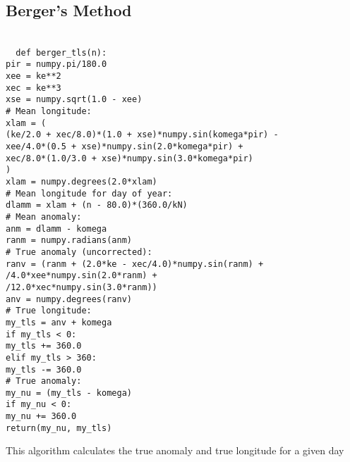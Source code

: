 \subsection{Berger's Method}
\label{app:berger}
\texttt{ \\
~~def berger\_tls(n):\\
 \indent pir = numpy.pi/180.0 \\
 \indent xee = ke**2 \\
 \indent xec = ke**3 \\
 \indent xse = numpy.sqrt(1.0 - xee) \\
 \indent \# Mean longitude: \\
 \indent xlam = ( \\
 \indent \indent (ke/2.0 + xec/8.0)*(1.0 + xse)*numpy.sin(komega*pir) -  \\
 \indent \indent xee/4.0*(0.5 + xse)*numpy.sin(2.0*komega*pir) +  \\
 \indent \indent xec/8.0*(1.0/3.0 + xse)*numpy.sin(3.0*komega*pir) \\
 \indent \indent ) \\
 \indent xlam = numpy.degrees(2.0*xlam) \\
 \indent \# Mean longitude for day of year: \\
 \indent dlamm = xlam + (n - 80.0)*(360.0/kN) \\
 \indent \# Mean anomaly: \\
 \indent anm = dlamm - komega \\
 \indent ranm = numpy.radians(anm) \\
 \indent \# True anomaly (uncorrected): \\
 \indent ranv = (ranm + (2.0*ke - xec/4.0)*numpy.sin(ranm) +  \\
 \indent {}/4.0*xee*numpy.sin(2.0*ranm) +  \\
 \indent {}/12.0*xec*numpy.sin(3.0*ranm)) \\
 \indent anv = numpy.degrees(ranv) \\
 \indent \# True longitude: \\
 \indent my\_tls = anv + komega \\
 \indent if my\_tls < 0: \\
 \indent \indent my\_tls += 360.0 \\
 \indent elif my\_tls > 360: \\
 \indent \indent my\_tls -= 360.0 \\
 \indent \# True anomaly: \\
 \indent my\_nu = (my\_tls - komega) \\
 \indent if my\_nu < 0: \\
 \indent \indent my\_nu += 360.0 \\
 \indent return(my\_nu, my\_tls) \\
}

This algorithm calculates the true anomaly and true longitude for a given day